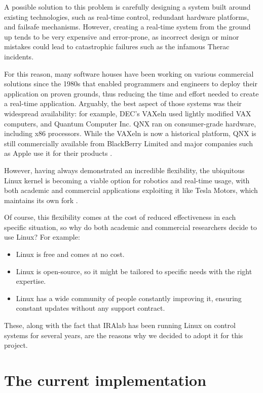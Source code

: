 \documentclass[a4paper,12pt]{report}
\begin{document}
A possible solution to this problem is carefully designing a system built around existing technologies, such as real-time control, redundant hardware platforms, and failsafe mechanisms. However, creating a real-time system from the ground up tends to be very expensive and error-prone, as incorrect design or minor mistakes could lead to catastrophic failures such as the infamous Therac \cite{therac-25-accidents} incidents.

For this reason, many software houses have been working on various commercial solutions since the 1980s that enabled programmers and engineers to deploy their application on proven grounds, thus reducing the time and effort needed to create a real-time application. Arguably, the best aspect of those systems was their widespread availability: for example, DEC's VAXeln used lightly modified VAX computers, and Quantum Computer Inc. QNX ran on consumer-grade hardware, including x86 processors. While the VAXeln is now a historical platform, QNX is still commercially available from BlackBerry Limited and major companies such as Apple use it for their products \cite{time-carplay-qnx}.

However, having always demonstrated an incredible flexibility, the ubiquitous Linux kernel is becoming a viable option for robotics and real-time usage, with both academic and commercial applications exploiting it like Tesla Motors, which maintains its own fork \cite{gh-tesla-linux}.

Of course, this flexibility comes at the cost of reduced effectiveness in each specific situation, so why do both academic and commercial researchers decide to use Linux? For example:
\begin{itemize}
  \item Linux is free and comes at no cost.
  \item Linux is open-source, so it might be tailored to specific needs with the right expertise.
  \item Linux has a wide community of people constantly improving it, ensuring constant updates without any support contract.
\end{itemize}

These, along with the fact that IRAlab has been running Linux on control systems for several years, are the reasons why we decided to adopt it for this project.

\section{The current implementation}
\end{document}
